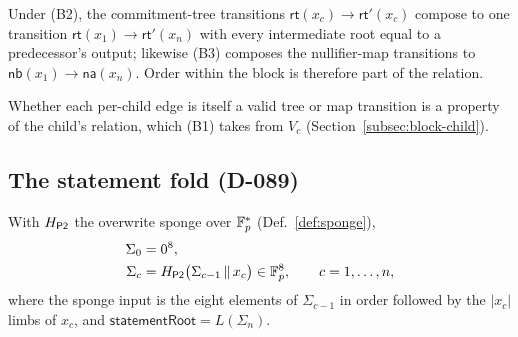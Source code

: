 \begin{property}
\label{prop:block-chain}
Under (B2), the commitment-tree transitions
$\mathsf{rt}(x_c)\to\mathsf{rt}'(x_c)$ compose to one transition
$\mathsf{rt}(x_1)\to\mathsf{rt}'(x_n)$ with every intermediate root equal to a
predecessor's output; likewise (B3) composes the nullifier-map transitions to
$\mathsf{nb}(x_1)\to\mathsf{na}(x_n)$. Order within the block is therefore part of
the relation.
\end{property}

Whether each per-child edge is itself a valid tree or map transition is a
property of the child's relation, which (B1) takes from $V_c$
(Section~\ref{subsec:block-child}).

\subsection{The statement fold (D-089)}
\label{subsec:block-fold}

\begin{definition}
\label{def:block-fold}
With $H_{\mathsf{P2}}$ the overwrite sponge over $\mathbb{F}_p^{*}$ (Def.~\ref{def:sponge}),
\begin{align}
  \Sigma_0 &= 0^8, \nonumber\\
  \Sigma_c &= H_{\mathsf{P2}}\big(\Sigma_{c-1}\,\|\,x_c\big) \in \mathbb{F}_p^8,
  \qquad c = 1,\dots,n, \label{eq:fold}
\end{align}
where the sponge input is the eight elements of $\Sigma_{c-1}$ in order followed by
the $|x_c|$ limbs of $x_c$, and $\mathsf{statementRoot} = L(\Sigma_n)$.
\end{definition}

